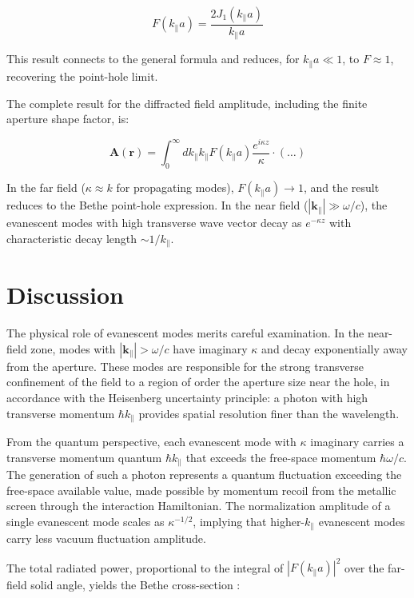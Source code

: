 \documentclass[%
 reprint,
 amsmath,amssymb,
 aps,
 floatfix,
]{revtex4-2}
\begin{document}
\begin{equation}
F(k_\parallel a) = \frac{2J_1(k_\parallel a)}{k_\parallel a}
\end{equation}

This result connects to the general formula and reduces, for $k_\parallel a \ll 1$, to $F \approx 1$, recovering the point-hole limit.

The complete result for the diffracted field amplitude, including the finite aperture shape factor, is:

\begin{equation}
\mathbf{A}(\mathbf{r}) = \int_0^\infty dk_\parallel k_\parallel F(k_\parallel a)\frac{e^{i\kappa z}}{\kappa}\cdot(\ldots)
\end{equation}

In the far field ($\kappa \approx k$ for propagating modes), $F(k_\parallel a) \rightarrow 1$, and the result reduces to the Bethe point-hole expression. In the near field ($|\mathbf{k}_\parallel| \gg \omega/c$), the evanescent modes with high transverse wave vector decay as $e^{-\kappa z}$ with characteristic decay length $\sim 1/k_\parallel$.

\section{Discussion}

The physical role of evanescent modes merits careful examination. In the near-field zone, modes with $|\mathbf{k}_\parallel| > \omega/c$ have imaginary $\kappa$ and decay exponentially away from the aperture. These modes are responsible for the strong transverse confinement of the field to a region of order the aperture size near the hole, in accordance with the Heisenberg uncertainty principle: a photon with high transverse momentum $\hbar k_\parallel$ provides spatial resolution finer than the wavelength.

From the quantum perspective, each evanescent mode with $\kappa$ imaginary carries a transverse momentum quantum $\hbar k_\parallel$ that exceeds the free-space momentum $\hbar\omega/c$. The generation of such a photon represents a quantum fluctuation exceeding the free-space available value, made possible by momentum recoil from the metallic screen through the interaction Hamiltonian. The normalization amplitude of a single evanescent mode scales as $\kappa^{-1/2}$, implying that higher-$k_\parallel$ evanescent modes carry less vacuum fluctuation amplitude.

The total radiated power, proportional to the integral of $|F(k_\parallel a)|^2$ over the far-field solid angle, yields the Bethe cross-section \cite{Bethe1944}:
\end{document}
